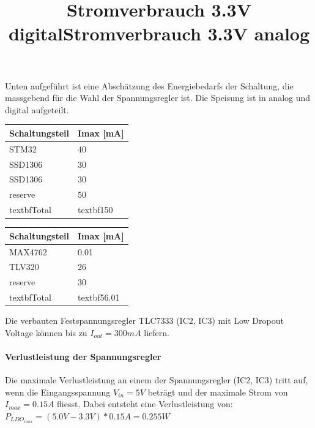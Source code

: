Unten aufgeführt ist eine Abschätzung des Energiebedarfs der Schaltung, die massgebend für die Wahl der Spannungsregler ist. Die Speisung ist in analog und digital aufgeteilt.

\begin{table}[H]
\title{Stromverbrauch 3.3V digital}
\centering
\begin{tabular}{|l|l|}
\hline
\textbf{Schaltungsteil} & \textbf{Imax {[}\si{mA}{]}} \\ \hline
STM32                   & 40                     \\ \hline
SSD1306                 & 30                     \\ \hline
SSD1306                 & 30                     \\ \hline
reserve                 & 50                     \\ \hline
textbf{Total}           & textbf{150}            \\ \hline
\end{tabular}
\end{table}

\begin{table}[H]
\title{Stromverbrauch 3.3V analog}
\centering
\begin{tabular}{|l|l|}
\hline
\textbf{Schaltungsteil} & \textbf{Imax {[}\si{mA}{]}} \\ \hline
MAX4762                 & 0.01                   \\ \hline
TLV320                  & 26                     \\ \hline
reserve                 & 30                     \\ \hline
textbf{Total}           & textbf{56.01}          \\ \hline
\end{tabular}
\end{table}

Die verbauten Festspannungsregler TLC7333 (IC2, IC3) mit Low Dropout Voltage können bis zu ${I_{out}=300\si{mA}}$ liefern.

\paragraph{Verlustleistung der Spannungsregler}

Die maximale Verlustleistung an einem der Spannungsregler (IC2, IC3) tritt auf, wenn die Eingangsspannung ${V_{in}=5\si{V}}$ beträgt und der maximale Strom von ${I_{max}=0.15\si{A}}$ fliesst.
Dabei entsteht eine Verlustleistung von:\
\
${P_{LDO_{max}}=(5.0\si{V}-3.3\si{V})*0.15\si{A}}=0.255\si{W}$



